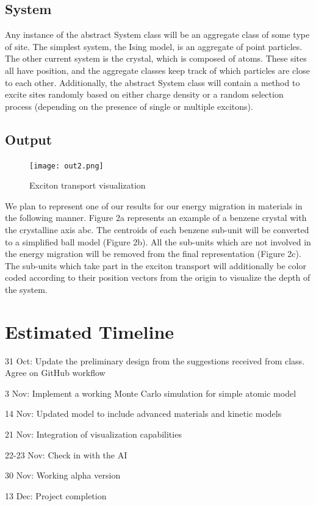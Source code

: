 \documentclass{article}
\begin{document}
\subsection{System}

Any instance of the abstract System class will be an aggregate class of some type of site. The simplest system, the Ising model, is an aggregate of point particles. The other current system is the crystal, which is composed of atoms. These sites all have position, and the aggregate classes keep track of which particles are close to each other. Additionally, the abstract System class will contain a method to excite sites randomly based on either charge density or a random selection process (depending on the presence of single or multiple excitons).

\subsection{Output}

\begin{figure}
    \centering
   \texttt{[image: out2.png]}
    \caption{Exciton transport visualization}
    \label{fig:my_label}
\end{figure}

We plan to represent one of our results for our energy migration in materials in the following manner. Figure 2a represents an example of a benzene crystal with the crystalline axis abc. The centroids of each benzene sub-unit will be converted to a simplified ball model (Figure 2b). All the sub-units which are not involved in the energy migration will be removed from the final representation (Figure 2c). The sub-units which take part in the exciton transport will additionally be color coded according to their position vectors from the origin to visualize the depth of the system. 


\section{Estimated Timeline}


31 Oct: Update the preliminary design from the suggestions received from class. Agree on GitHub workflow

3 Nov: Implement a working Monte Carlo simulation for simple atomic model

14 Nov: Updated model to include advanced materials and kinetic models

21 Nov: Integration of visualization capabilities

22-23 Nov: Check in with the AI

30 Nov: Working alpha version

13 Dec: Project completion

\printbibliography
\end{document}
